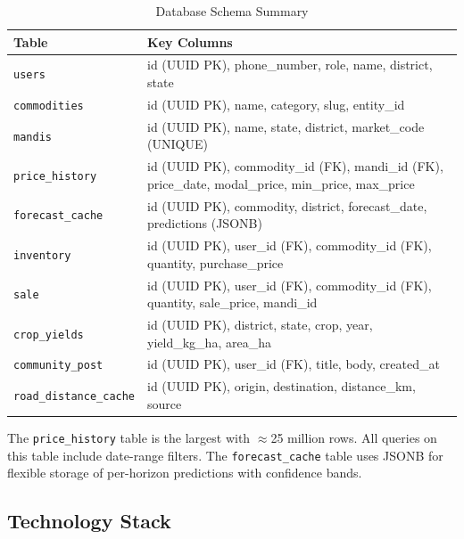 \documentclass[12pt,a4paper]{report}
\begin{document}
\begin{table}[H]
\centering
\caption{Database Schema Summary}
\label{tab:schema}
\begin{tabular}{|l|p{8.5cm}|}
\hline
\textbf{Table} & \textbf{Key Columns} \\
\hline
\texttt{users} & id (UUID PK), phone\_number, role, name, district, state \\
\texttt{commodities} & id (UUID PK), name, category, slug, entity\_id \\
\texttt{mandis} & id (UUID PK), name, state, district, market\_code (UNIQUE) \\
\texttt{price\_history} & id (UUID PK), commodity\_id (FK), mandi\_id (FK), price\_date, modal\_price, min\_price, max\_price \\
\texttt{forecast\_cache} & id (UUID PK), commodity, district, forecast\_date, predictions (JSONB) \\
\texttt{inventory} & id (UUID PK), user\_id (FK), commodity\_id (FK), quantity, purchase\_price \\
\texttt{sale} & id (UUID PK), user\_id (FK), commodity\_id (FK), quantity, sale\_price, mandi\_id \\
\texttt{crop\_yields} & id (UUID PK), district, state, crop, year, yield\_kg\_ha, area\_ha \\
\texttt{community\_post} & id (UUID PK), user\_id (FK), title, body, created\_at \\
\texttt{road\_distance\_cache} & id (UUID PK), origin, destination, distance\_km, source \\
\hline
\end{tabular}
\end{table}

The \texttt{price\_history} table is the largest with $\approx$25 million rows. All
queries on this table include date-range filters. The \texttt{forecast\_cache} table uses
JSONB for flexible storage of per-horizon predictions with confidence bands.

\subsection{Technology Stack}
\end{document}
